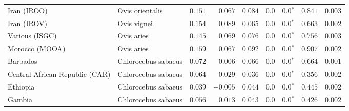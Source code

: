 \begin{center}
\begin{adjustbox}{width = 1\textwidth}
\begin{tabular}{|l|l|r|r|r|r|r|r|r|}
                    Iran (IROO) &      Ovis orientalis &                                        $ 0.151$ &                                           $ 0.067$ &                      $ 0.084$ &            $0.0$ &                  $\bm{0.0{^*}}$ &                                           $ 0.841$ &           $ 0.003$ \\
                    Iran (IROV) &          Ovis vignei &                                        $ 0.154$ &                                           $ 0.089$ &                      $ 0.065$ &            $0.0$ &                  $\bm{0.0{^*}}$ &                                           $ 0.663$ &           $ 0.002$ \\
                 Various (ISGC) &           Ovis aries &                                        $ 0.145$ &                                           $ 0.069$ &                      $ 0.076$ &            $0.0$ &                  $\bm{0.0{^*}}$ &                                           $ 0.756$ &           $ 0.003$ \\
                 Morocco (MOOA) &           Ovis aries &                                        $ 0.159$ &                                           $ 0.067$ &                      $ 0.092$ &            $0.0$ &                  $\bm{0.0{^*}}$ &                                           $ 0.907$ &           $ 0.002$ \\
                       Barbados &  Chlorocebus sabaeus &                                        $ 0.072$ &                                           $ 0.006$ &                      $ 0.066$ &            $0.0$ &                  $\bm{0.0{^*}}$ &                                           $ 0.664$ &           $ 0.001$ \\
 Central African Republic (CAR) &  Chlorocebus sabaeus &                                        $ 0.064$ &                                           $ 0.029$ &                      $ 0.036$ &            $0.0$ &                  $\bm{0.0{^*}}$ &                                           $ 0.356$ &           $ 0.002$ \\
                       Ethiopia &  Chlorocebus sabaeus &                                        $ 0.039$ &                                           $-0.005$ &                      $ 0.044$ &            $0.0$ &                  $\bm{0.0{^*}}$ &                                           $ 0.445$ &           $ 0.002$ \\
                         Gambia &  Chlorocebus sabaeus &                                        $ 0.056$ &                                           $ 0.013$ &                      $ 0.043$ &            $0.0$ &                  $\bm{0.0{^*}}$ &                                           $ 0.426$ &           $ 0.002$ \\

\end{tabular}
\end{adjustbox}
\end{center}
